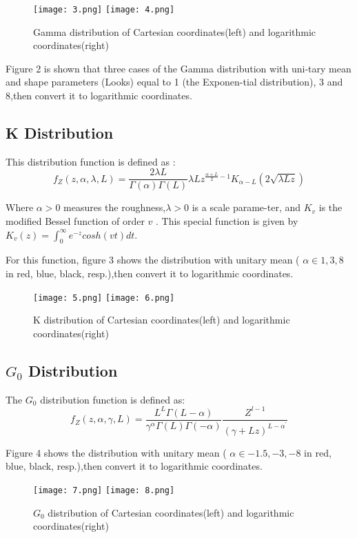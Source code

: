 \documentclass[UTF8,a4paper,10pt]{ctexart}
\begin{document}
\begin{figure}[htb] \center
	\texttt{[image: 3.png]}
	\texttt{[image: 4.png]}
	\caption{ Gamma distribution of Cartesian coordinates(left) and logarithmic coordinates(right)} 
\end{figure}
\par Figure 2 is shown that three  cases of the Gamma distribution with uni-tary mean and shape parameters (Looks) equal to 1 (the Exponen-tial distribution), 3 and 8,then convert it to logarithmic coordinates.

\subsection{K Distribution}
This distribution function is defined as :
\begin{equation}
f_Z(z,\alpha,\lambda,L) = \frac{2{\lambda}L}{\Gamma(\alpha)\Gamma(L)}{\lambda}Lz^{\frac{\alpha+L}{2}-1}K_{\alpha-L}(2\sqrt{\lambda{Lz}})
\end{equation}
\par Where $\alpha>0$ measures the roughness,$\lambda>0$ is a scale parame-ter, and $K_v$ is the modified Bessel function of order $v$ . This special function is given by $K_v(z) = \int_0^\infty {e^{-z}cosh(vt)dt}$.
\par For this function, figure 3 shows the distribution with unitary mean ( $\alpha \in { 1,3,8 }$ in red, blue, black, resp.),then convert it to logarithmic coordinates.

\begin{figure}[htb] \center
	\texttt{[image: 5.png]}
	\texttt{[image: 6.png]}
	\caption{K distribution of Cartesian coordinates(left) and logarithmic coordinates(right)} 
\end{figure}

\subsection{$G_0$ Distribution}
The $G_0$ distribution function is defined as:
\begin{equation}
f_Z(z,\alpha,\gamma,L) = \frac{L^L\Gamma(L-\alpha)}{\gamma^\alpha\Gamma(L)\Gamma(-\alpha)}\frac{Z^{l-1}}{(\gamma+Lz)^{{L-\alpha}^\prime}}
\end{equation}
\par Figure 4 shows the distribution with unitary mean ( $\alpha \in { -1.5,-3,-8 }$ in red, blue, black, resp.),then convert it to logarithmic coordinates.

\begin{figure}[htb] \center
	\texttt{[image: 7.png]}
	\texttt{[image: 8.png]}
	\caption{ $G_0$ distribution of Cartesian coordinates(left) and logarithmic coordinates(right)} 
\end{figure}
\end{document}
